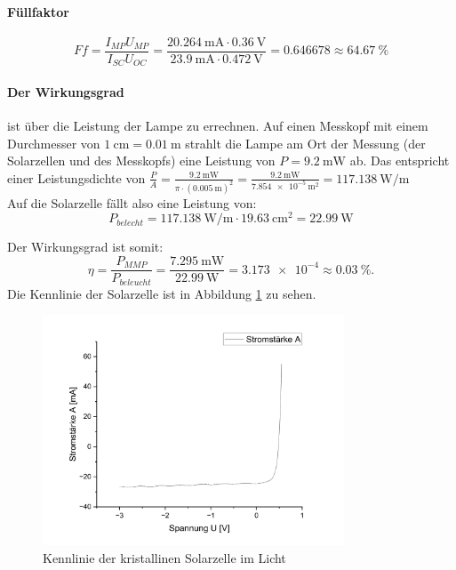 \documentclass[12pt,a4paper,ngerman]{report}
\begin{document}
		\paragraph{Füllfaktor}
		
		$$    Ff=\frac{I_{MP}U_{MP}}{I_{SC}U_{OC}}= \frac{\qty{20,264}{\milli\ampere}\cdot \qty{0,36}{\volt}}{\qty{23,9}{\milli\ampere} \cdot \qty{0,472}{\volt}} = \num{0,646678} \approx \qty{64,67}{\percent}  $$
		
		\paragraph{Der Wirkungsgrad} ist über die Leistung der Lampe zu errechnen. Auf einen Messkopf mit einem Durchmesser von $\SI{1}{\centi\m} = \qty{0,01}{\m}$ strahlt die Lampe am Ort der Messung (der Solarzellen und des Messkopfs) eine Leistung von $P = \SI{9,2}{\milli\watt} $ ab. Das entspricht einer Leistungsdichte von $\frac{P}{A} = \frac{\qty{9,2}{\milli\watt}}{\pi\cdot(\qty{0,005}{\m})^2} = \frac{\qty{9,2}{\milli\watt}}{\qty{7,854e-5}{\square\metre}} = \qty{117,138}{\watt\per\m} $\\
		Auf die Solarzelle fällt also eine Leistung von:
		\[P_ {belecht} = \qty{117,138}{\watt\per\m} \cdot \qty{19,63}{\centi\m^2} = \qty{22,99}{\watt}\]
		
		Der Wirkungsgrad ist somit:
		$$
		\eta=\frac{P_{MMP}}{P_{beleucht}} = \frac{\qty{7,295}{\milli\watt}}{\qty{22,99}{\watt}} = \num{3,173e-4} \approx \qty{0,03}{\percent}.
		$$
		Die Kennlinie der Solarzelle ist in Abbildung \ref{fig:SolarKristallinHell} zu sehen.\\
		
		\begin{figure}
			\centering
			\includegraphics[width=0.8\textwidth]{Origin/SolarKristallHell.png}
			\caption{Kennlinie der kristallinen Solarzelle im Licht}
			\label{fig:SolarKristallinHell}
		\end{figure}
				
\end{document}
